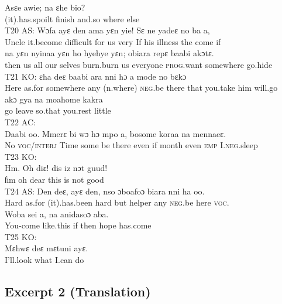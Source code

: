 \documentclass[output=paper,colorlinks,citecolor=brown]{langscibook}
\begin{document}
    \ex
    \gll    Asɛe awie; na ɛhe bio?\\
            (it).has.spoilt finish and.so where else \\
    \z
\ex T20 AS:\label{ex:obeng:49}
    \ea
    \gll    Wɔfa ayɛ den ama yɛn yie! Sɛ ne yadeɛ no ba a, \\
            Uncle it.become difficult for us very If his illness the come if \\
    \ex
    \gll    na yɛn nyinaa yɛn ho  hyehye yɛn; obiara repɛ baabi akɔtɛ.\\
            then us all our selves burn.burn us everyone \textsc{prog}.want somewhere go.hide\\
    \z
\ex\label{ex:obeng:50}
    T21 KO:
    \ea
    \gll    ɛha deɛ baabi ara nni hɔ a mode no bɛkɔ \\
            Here as.for somewhere any (n.where) \textsc{neg}.be there that you.take him will.go \\
    \ex
    \gll    akɔ gya na moahome kakra\\
            go leave so.that you.rest little \\
    \z
\ex\label{ex:obeng:51}
    T22 AC:\\
    \gll    Daabi oo. Mmerɛ bi wɔ hɔ mpo a, bosome koraa na mennaeɛ.\\
            No \textsc{voc/interj} Time some be there even if month even \textsc{emp} I.\textsc{neg}.sleep \\
\ex\label{ex:obeng:52}
    T23 KO:\\
    \gll    Hm. Oh diɛ! dis iz nɔt guud!\\
            ɦm oh dear this is not good\\
\ex\label{ex:obeng:53}
    T24 AS:
    \ea
    \gll    Den deɛ, ayɛ den, nso ɔboafoɔ biara nni ha oo.\\
            Hard as.for (it).has.been hard but helper any \textsc{neg}.be here \textsc{voc}.\\
    \ex
    \gll    Woba sei a, na anidasoɔ aba. \\
            You-come like.this if then hope has.come\\
    \z
\ex\label{ex:obeng:54}
    T25 KO:\\
    \gll    Mɛhwɛ deɛ mɛtuni ayɛ.\\
 	        I’ll.look what I.can do\\
\z

\subsection{Excerpt 2 (Translation)}\largerpage
\end{document}
